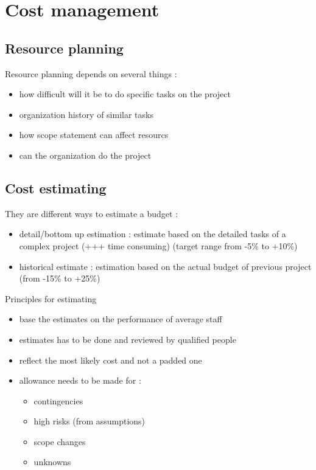 \documentclass{article}
\begin{document}
\newpage
\section{Cost management}
\subsection{Resource planning}
Resource planning depends on several things :
\begin{itemize}
    \item how difficult will it be to do specific tasks on the project
    \item organization history of similar tasks
    \item how scope statement can affect resourcs
    \item can  the organization do the project
\end{itemize}

\subsection{Cost estimating}
They are different ways to estimate a budget :
\begin{itemize}
	\item detail/bottom up estimation : estimate based on the detailed tasks of a complex project (+++ time consuming) (target range from -5\% to +10\%)
	\item historical estimate : estimation based on the actual budget of previous project (from -15\% to +25\%)
\end{itemize}


Principles for estimating 
\begin{itemize}
	\item base the estimates on the performance of average staff
	\item estimates has to be done and reviewed by qualified people
	\item reflect the most likely cost and not a padded one
	\item allowance needs to be made for :
	\begin{itemize}
		\item contingencies
		\item high risks (from assumptions)
		\item scope changes
		\item unknowns
	\end{itemize} 
\end{itemize}
\end{document}

